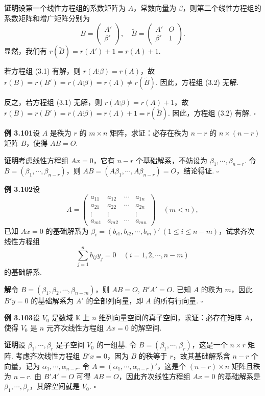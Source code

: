 \documentclass[UTF8, 12pt, fontset=fandol, oneside]{ctexart}
\begin{document}
\noindent\textbf{证明}\quad 设第一个线性方程组的系数矩阵为 $A$，常数向量为 $\beta$，则第二个线性方程组的系数矩阵和增广矩阵分别为
\[
B=\begin{pmatrix}A'\\\beta'\end{pmatrix},\quad
\widetilde{B}=\begin{pmatrix}A'&O\\\beta'&1\end{pmatrix}.
\]
显然，我们有 $r(\widetilde{B})=r(A')+1=r(A)+1$.

若方程组 (3.1) 有解，则 $r(A\vdots\beta)=r(A)$，故 $r(B)=r(B')=r(A\vdots\beta)=r(A)\ne r(\widetilde{B})$. 因此，方程组 (3.2) 无解.

反之，若方程组 (3.1) 无解，则 $r(A\vdots\beta)=r(A)+1$，故 $r(B)=r(B')=r(A\vdots\beta)=r(A)+1=r(\widetilde{B})$. 因此，方程组 (3.2) 有解. $\square$

\noindent\textbf{例 3.101}\quad 设 $A$ 是秩为 $r$ 的 $m\times n$ 矩阵，求证：必存在秩为 $n-r$ 的 $n\times(n-r)$ 矩阵 $B$，使得 $AB=O$.

\noindent\textbf{证明}\quad 考虑线性方程组 $Ax=0$，它有 $n-r$ 个基础解系，不妨设为 $\beta_1,\cdots,\beta_{n-r}$. 令 $B=(\beta_1,\cdots,\beta_{n-r})$，则 $AB=(A\beta_1,\cdots,A\beta_{n-r})=O$，结论得证. $\square$

\noindent\textbf{例 3.102}\quad 设
\[
A=\begin{pmatrix}
a_{11}&a_{12}&\cdots&a_{1n}\\
a_{21}&a_{22}&\cdots&a_{2n}\\
\vdots&\vdots&&\vdots\\
a_{m1}&a_{m2}&\cdots&a_{mn}
\end{pmatrix}\quad (m<n),
\]
已知 $Ax=0$ 的基础解系为 $\beta_i=(b_{i1},b_{i2},\cdots,b_{in})'\ (1\le i\le n-m)$，试求齐次线性方程组
\[
\sum_{j=1}^n b_{ij}y_j=0\quad (i=1,2,\cdots,n-m)
\]
的基础解系.

\noindent\textbf{解}\quad 令 $B=(\beta_1,\beta_2,\cdots,\beta_{n-m})$，则 $AB=O$, $B'A'=O$. 已知 $A$ 的秩为 $m$，因此 $B'y=0$ 的基础解系为 $A'$ 的全部列向量，即 $A$ 的所有行向量. $\square$

\noindent\textbf{例 3.103}\quad 设 $V_0$ 是数域 $\mathbb{K}$ 上 $n$ 维列向量空间的真子空间，求证：必存在矩阵 $A$，使得 $V_0$ 是 $n$ 元齐次线性方程组 $Ax=0$ 的解空间.

\noindent\textbf{证明}\quad 设 $\beta_1,\cdots,\beta_r$ 是子空间 $V_0$ 的一组基. 令 $B=(\beta_1,\cdots,\beta_r)$，这是一个 $n\times r$ 矩阵. 考虑齐次线性方程组 $B'x=0$，因为 $B$ 的秩等于 $r$，故其基础解系含 $n-r$ 个向量，记为 $\alpha_1,\cdots,\alpha_{n-r}$. 令 $A=(\alpha_1,\cdots,\alpha_{n-r})'$，这是个 $(n-r)\times n$ 矩阵且秩为 $n-r$. 由 $B'A'=O$ 可得 $AB=O$，因此齐次线性方程组 $Ax=0$ 的基础解系是 $\beta_1,\cdots,\beta_r$，其解空间就是 $V_0$. $\square$
\end{document}
